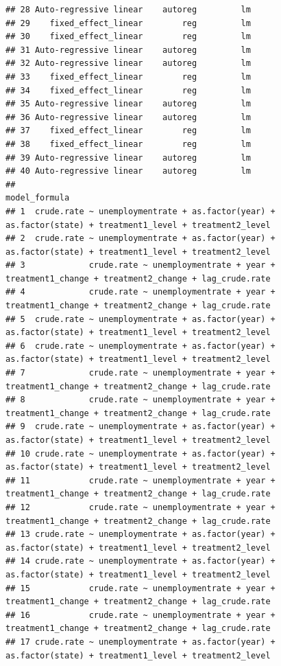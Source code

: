 \documentclass[
]{article}
\begin{document}
\begin{verbatim}
## 28 Auto-regressive linear    autoreg         lm
## 29    fixed_effect_linear        reg         lm
## 30    fixed_effect_linear        reg         lm
## 31 Auto-regressive linear    autoreg         lm
## 32 Auto-regressive linear    autoreg         lm
## 33    fixed_effect_linear        reg         lm
## 34    fixed_effect_linear        reg         lm
## 35 Auto-regressive linear    autoreg         lm
## 36 Auto-regressive linear    autoreg         lm
## 37    fixed_effect_linear        reg         lm
## 38    fixed_effect_linear        reg         lm
## 39 Auto-regressive linear    autoreg         lm
## 40 Auto-regressive linear    autoreg         lm
##                                                                                               model_formula
## 1  crude.rate ~ unemploymentrate + as.factor(year) + as.factor(state) + treatment1_level + treatment2_level
## 2  crude.rate ~ unemploymentrate + as.factor(year) + as.factor(state) + treatment1_level + treatment2_level
## 3             crude.rate ~ unemploymentrate + year + treatment1_change + treatment2_change + lag_crude.rate
## 4             crude.rate ~ unemploymentrate + year + treatment1_change + treatment2_change + lag_crude.rate
## 5  crude.rate ~ unemploymentrate + as.factor(year) + as.factor(state) + treatment1_level + treatment2_level
## 6  crude.rate ~ unemploymentrate + as.factor(year) + as.factor(state) + treatment1_level + treatment2_level
## 7             crude.rate ~ unemploymentrate + year + treatment1_change + treatment2_change + lag_crude.rate
## 8             crude.rate ~ unemploymentrate + year + treatment1_change + treatment2_change + lag_crude.rate
## 9  crude.rate ~ unemploymentrate + as.factor(year) + as.factor(state) + treatment1_level + treatment2_level
## 10 crude.rate ~ unemploymentrate + as.factor(year) + as.factor(state) + treatment1_level + treatment2_level
## 11            crude.rate ~ unemploymentrate + year + treatment1_change + treatment2_change + lag_crude.rate
## 12            crude.rate ~ unemploymentrate + year + treatment1_change + treatment2_change + lag_crude.rate
## 13 crude.rate ~ unemploymentrate + as.factor(year) + as.factor(state) + treatment1_level + treatment2_level
## 14 crude.rate ~ unemploymentrate + as.factor(year) + as.factor(state) + treatment1_level + treatment2_level
## 15            crude.rate ~ unemploymentrate + year + treatment1_change + treatment2_change + lag_crude.rate
## 16            crude.rate ~ unemploymentrate + year + treatment1_change + treatment2_change + lag_crude.rate
## 17 crude.rate ~ unemploymentrate + as.factor(year) + as.factor(state) + treatment1_level + treatment2_level

\end{verbatim}
\end{document}
